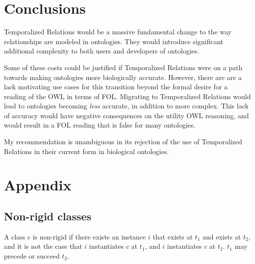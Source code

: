 \documentclass{bioinfo}
\begin{document}
\section{Conclusions}

Temporalized Relations would be a massive fundamental change to the
way relationships are modeled in ontologies. They would introduce
significant additional complexity to both users and developers of
ontologies.

Some of these costs could be justified if Temporalized Relations were
on a path towards making ontologies more biologically
accurate. However, there are are a lack motivating use cases for this
transition beyond the formal desire for a reading of the OWL in terms
of FOL. Migrating to Temporalized Relations would lead to ontologies
becoming \emph{less} accurate, in addition to more complex. This lack
of accuracy would have negative consequences on the utility OWL
reasoning, and would result in a FOL reading that is false for many
ontologies.

My recommendation is unambiguous in its rejection of the use of
Temporalized Relations in their current form in biological ontologies.





\newpage
\section*{Appendix}

\subsection{Non-rigid classes}

A class $c$ is non-rigid if there exists an instance $i$ that exists
at $t_1$ and exists at $t_2$, and it is not the case that $i$
instantiates $c$ at $t_1$, and $i$ instantiates $c$ at $t_2$. $t_1$
may precede or succeed $t_2$.
\end{document}
